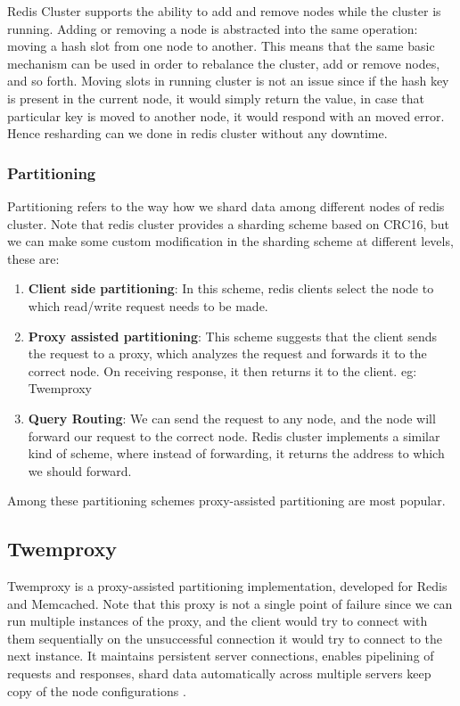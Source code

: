 \documentclass[11pt]{article}
\begin{document}
Redis Cluster supports the ability to add and remove nodes while the
cluster is running. Adding or removing a node is abstracted into
the same operation: moving a hash slot from one node to another. This
means that the same basic mechanism can be used in order to rebalance the
cluster, add or remove nodes, and so forth. Moving slots in running cluster 
is not an issue since if the hash key is present in the current node, it would simply 
return the value, in case that particular key is moved to another node, it would
respond with an moved error. Hence resharding can we done in redis cluster without
any downtime.

\subsubsection*{Partitioning \cite{redis}}
Partitioning refers to the way how we shard data among
different nodes of redis cluster. Note that redis cluster provides a 
sharding scheme based on CRC16, but we can make some custom modification in the sharding
scheme at different levels, these are:
\begin{enumerate}
    \item \textbf{Client side partitioning}: In this scheme, redis clients select the
        node to which read/write request needs to be made.
    \item \textbf{Proxy assisted partitioning}: This scheme suggests that the client sends
        the request to a proxy, which analyzes the request and forwards it to the correct node.
        On receiving response, it then returns it to the client. eg: Twemproxy
    \item \textbf{Query Routing}: We can send the request to any node, and the node will
        forward our request to the correct node. Redis cluster implements a similar kind of
        scheme, where instead of forwarding, it returns the address to which we should forward.
\end{enumerate}
Among these partitioning schemes proxy-assisted partitioning are most popular.

\subsection*{Twemproxy}
Twemproxy is a proxy-assisted partitioning implementation, developed for Redis and Memcached.
Note that this proxy is not a single point of failure since we can run multiple
instances of the proxy, and the client would try to connect with them sequentially
on the unsuccessful connection it would try to connect to the next instance.
It maintains persistent server connections, enables pipelining of
requests and responses, shard data automatically across multiple servers keep copy
of the node configurations \cite{twem}.
\\
\end{document}
